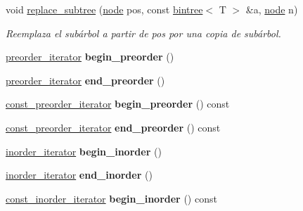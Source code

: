 \begin{DoxyCompactItemize}
void \hyperlink{classbintree_a75647277e4d20981651450e86ffad165}{replace\-\_\-subtree} (\hyperlink{classbintree_1_1node}{node} pos, const \hyperlink{classbintree}{bintree}$<$ T $>$ \&a, \hyperlink{classbintree_1_1node}{node} n)
\begin{DoxyCompactList}\small\item\em Reemplaza el subárbol a partir de pos por una copia de subárbol. \end{DoxyCompactList}\item 
\hypertarget{classbintree_aa03570e8e81b0f6e12a0901caa631973}{\hyperlink{classbintree_1_1preorder__iterator}{preorder\-\_\-iterator} {\bfseries begin\-\_\-preorder} ()}\label{classbintree_aa03570e8e81b0f6e12a0901caa631973}

\item 
\hypertarget{classbintree_a5d0252ac17ef93a03f86c712650724af}{\hyperlink{classbintree_1_1preorder__iterator}{preorder\-\_\-iterator} {\bfseries end\-\_\-preorder} ()}\label{classbintree_a5d0252ac17ef93a03f86c712650724af}

\item 
\hypertarget{classbintree_ac0e75f2d7528b74174f0733e19e31024}{\hyperlink{classbintree_1_1const__preorder__iterator}{const\-\_\-preorder\-\_\-iterator} {\bfseries begin\-\_\-preorder} () const }\label{classbintree_ac0e75f2d7528b74174f0733e19e31024}

\item 
\hypertarget{classbintree_a46866eba9135e02bf020ea3d3be9955b}{\hyperlink{classbintree_1_1const__preorder__iterator}{const\-\_\-preorder\-\_\-iterator} {\bfseries end\-\_\-preorder} () const }\label{classbintree_a46866eba9135e02bf020ea3d3be9955b}

\item 
\hypertarget{classbintree_af24d2fffd7aea66b878f214b906cb4aa}{\hyperlink{classbintree_1_1inorder__iterator}{inorder\-\_\-iterator} {\bfseries begin\-\_\-inorder} ()}\label{classbintree_af24d2fffd7aea66b878f214b906cb4aa}

\item 
\hypertarget{classbintree_a01bef6192ff6547bd468847efb9f7cd5}{\hyperlink{classbintree_1_1inorder__iterator}{inorder\-\_\-iterator} {\bfseries end\-\_\-inorder} ()}\label{classbintree_a01bef6192ff6547bd468847efb9f7cd5}

\item 
\hypertarget{classbintree_a7285974b783b29b0d10afefcd5658009}{\hyperlink{classbintree_1_1const__inorder__iterator}{const\-\_\-inorder\-\_\-iterator} {\bfseries begin\-\_\-inorder} () const }\label{classbintree_a7285974b783b29b0d10afefcd5658009}


\end{DoxyCompactItemize}
